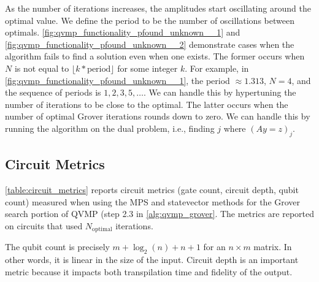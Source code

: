 \documentclass[11pt]{article}
\theoremstyle{definition}
\theoremstyle{remark}
\begin{document}
As the number of iterations increases, the amplitudes start oscillating around
the optimal value.  We define the period to be the number of oscillations
between optimals.  \cref{fig:qvmp_functionality_pfound_unknown__1} and
\cref{fig:qvmp_functionality_pfound_unknown__2} demonstrate cases when the
algorithm fails to find a solution even when one exists.  The former occurs when
$N$ is not equal to $\lfloor k * \text{period} \rfloor$ for some integer $k$.
For example, in \cref{fig:qvmp_functionality_pfound_unknown__1}, the period
$\approx 1.313$, $N = 4$, and the sequence of periods is $1, 2, 3, 5, \ldots$.
We can handle this by hypertuning the number of iterations to be close to the
optimal.  The latter occurs when the number of optimal Grover iterations rounds
down to zero. We can handle this by running the algorithm on the dual problem,
i.e., finding $j$ where $(Ay = z)_j$.

\subsection{Circuit Metrics} \label{sec:circuit_metrics}



\cref{table:circuit_metrics} reports circuit metrics (gate count, circuit depth,
qubit count) measured when using the MPS and statevector methods for the Grover
search portion of QVMP (step 2.3 in \cref{alg:qvmp_grover}. The metrics are
reported on circuits that used $N_{\text{optimal}}$ iterations.

The qubit count is precisely $m + \log_2(n) + n + 1$ for an $n \times m$ matrix.
In other words, it is linear in the size of the input. Circuit depth is an
important metric because it impacts both transpilation time and fidelity of the
output.
\end{document}
